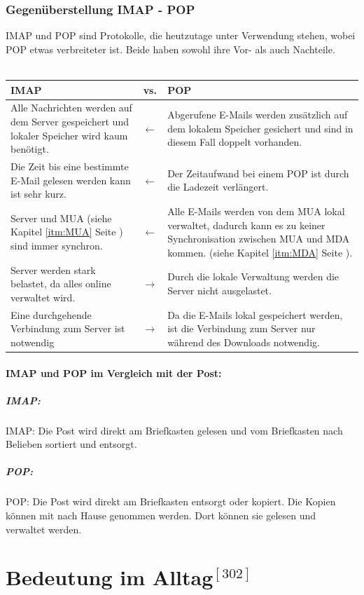 \documentclass[12pt,a4paper]{report}
\begin{document}
\begin{onehalfspace}
\subsubsection{Gegenüberstellung IMAP - POP} \label{sssec:IMAPvsPOP}
IMAP und POP sind Protokolle, die heutzutage unter Verwendung stehen, wobei POP etwas verbreiteter ist. Beide haben sowohl ihre Vor- als auch Nachteile. \\\\
\begin{center}
\begin{tabular}{p{6cm}|c|p{6cm}}
\textbf{IMAP} & vs. &\textbf{POP}\\
\hline
Alle Nachrichten werden auf dem Server gespeichert und lokaler Speicher wird kaum benötigt. & $\leftarrow$ & Abgerufene E-Mails werden zusätzlich auf dem lokalem Speicher gesichert und sind in diesem Fall doppelt vorhanden. \\
\hline
Die Zeit bis eine bestimmte E-Mail gelesen werden kann ist sehr kurz. & $\leftarrow$ & Der Zeitaufwand bei einem POP ist durch die Ladezeit verlängert. \\
\hline
Server und MUA (siehe Kapitel \ref{itm:MUA} Seite \pageref{itm:MUA}) sind immer synchron. & $\leftarrow$ & Alle E-Mails werden von dem MUA lokal verwaltet, dadurch kann es zu keiner Synchronisation zwischen MUA und MDA kommen.  (siehe Kapitel \ref{itm:MDA} Seite \pageref{itm:MDA}).\\
\hline
Server werden stark belastet, da alles online verwaltet wird. & $\rightarrow$ & Durch die lokale Verwaltung werden die Server nicht ausgelastet.\\
\hline
Eine durchgehende Verbindung zum Server ist notwendig & $\rightarrow$ & Da die E-Mails lokal gespeichert werden, ist die Verbindung zum Server nur während des Downloads notwendig.
\end{tabular}
\end{center}
\paragraph{IMAP und POP im Vergleich mit der Post:}
\subparagraph{IMAP:} IMAP: Die Post wird direkt am Briefkasten gelesen und vom Briefkasten nach Belieben sortiert und entsorgt.
\subparagraph{POP:} POP: Die Post wird direkt am Briefkasten entsorgt oder kopiert. Die Kopien können mit nach Hause genommen werden. Dort können sie gelesen und verwaltet werden. 
\section*{Bedeutung im Alltag$^{[302]}$}

\end{onehalfspace}
\end{document}
